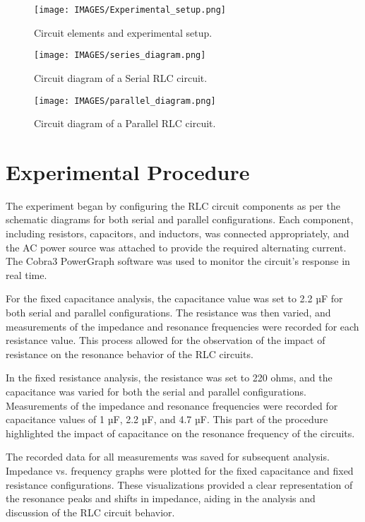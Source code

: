 \documentclass[journal]{IEEEtran}
\begin{document}
\begin{figure}[H]
    \centering
    \texttt{[image: IMAGES/Experimental\_setup.png]}
    \caption{Circuit elements and experimental setup.}
    \label{fig:experimental_setup}
\end{figure}

\begin{figure}[H]
    \centering
    \texttt{[image: IMAGES/series\_diagram.png]}
    \caption{Circuit diagram of a Serial RLC circuit.}
    \label{fig:serial_circuit}
\end{figure}

\begin{figure}[H]
    \centering
    \texttt{[image: IMAGES/parallel\_diagram.png]}
    \caption{Circuit diagram of a Parallel RLC circuit.}
    \label{fig:parallel_circuit}
\end{figure}

\section{Experimental Procedure}
The experiment began by configuring the RLC circuit components as per the schematic diagrams for both serial and parallel configurations. Each component, including resistors, capacitors, and inductors, was connected appropriately, and the AC power source was attached to provide the required alternating current. The Cobra3 PowerGraph software was used to monitor the circuit's response in real time.

For the fixed capacitance analysis, the capacitance value was set to 2.2 µF for both serial and parallel configurations. The resistance was then varied, and measurements of the impedance and resonance frequencies were recorded for each resistance value. This process allowed for the observation of the impact of resistance on the resonance behavior of the RLC circuits.

In the fixed resistance analysis, the resistance was set to 220 ohms, and the capacitance was varied for both the serial and parallel configurations. Measurements of the impedance and resonance frequencies were recorded for capacitance values of 1 µF, 2.2 µF, and 4.7 µF. This part of the procedure highlighted the impact of capacitance on the resonance frequency of the circuits.

The recorded data for all measurements was saved for subsequent analysis. Impedance vs. frequency graphs were plotted for the fixed capacitance and fixed resistance configurations. These visualizations provided a clear representation of the resonance peaks and shifts in impedance, aiding in the analysis and discussion of the RLC circuit behavior.
\end{document}
